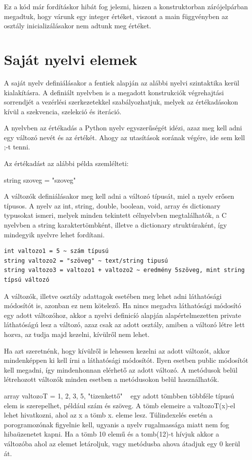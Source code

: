 Ez a kód már fordításkor hibát fog jelezni, hiszen a konstruktorban zárójelpárban megadtuk, hogy várunk egy integer értéket, viszont a main függvényben az osztály inicializálásakor nem adtunk meg értéket. 
\section{Saját nyelvi elemek}
A saját nyelv definiálásakor a fentiek alapján az alábbi nyelvi szintaktika kerül kialakításra.
A definiált nyelvben is a megadott konstrukciók végrehajtási sorrendjét a vezérlési szerkezetekkel szabályozhatjuk, melyek az értékadásokon kívül a szekvencia, szelekció és iteráció.

A nyelvben az értékadás a Python nyelv egyszerűségét idézi, azaz meg kell adni egy változó nevét és az értékét. Ahogy az utasítások sorának végére, ide sem kell ;-t tenni.

Az értékadást az alábbi példa szemlélteti:
\begin{cpp}
string szoveg = "szoveg"
\end{cpp}

A változók definiálásakor meg kell adni a változó típusát, miel a nyelv erősen típusos. A nyelv az int, string, double, boolean, void, array és dictionary typusokat ismeri, melyek minden tekintett célnyelvben megtalálhatók, a C nyelvben a string karaktertömbként, illetve a dictionary struktúraként, így mindegyik nyelvre lehet fordítani.

\begin{verbatim}
int valtozo1 = 5 ~ szám típusú
string valtozo2 = "szöveg" ~ text/string tipusú
string valtozo3 = valtozo1 + valtozo2 ~ eredmény 5szöveg, mint string típsú változó
\end{verbatim}

A változók, illetve osztály adattagok esetében meg lehet adni láthatósági módosítót is, azonban ez nem kötelező. Ha nincs megadva láthatósági módosító egy adott változóhoz, akkor a nyelvi definicíó alapján alapértelmezetten private láthatóságú lesz a változó, azaz csak az adott osztály, amiben a változó létre lett hozva, az tudja majd kezelni, kívülről nem lehet.

Ha azt szeretnénk, hogy kívülről is lehessen kezelni az adott változót, akkor mindenképpen ki kell írni a láthatósági módosítót. Ilyen esetben public módosítót kell megadni, így mindenhonnan elérhető az adott változó. A metódusok belül létrehozott változók minden esetben a metódusokon belül használhatók.

array valtozoT = {1, 2, 3, 5, "tizenkettő"} ~ egy adott tömbben többféle típusú elem is szerepelhet, például szám és szöveg. A tömb elemeire a valtozoT(x)-el lehet hivatkozni, ahol az x a tömb x. eleme lesz.
Túlindexelés esetén a porogramozónak figyelnie kell, ugyanis a nyelv rugalmassága miatt nem fog hibaüzenetet kapni. Ha a tömb 10 elemű és a tomb(12)-t hívjuk akkor a változóba ahol az elemet letároljuk, vagy metódusba ahova átadjuk egy 0 kerül át.


